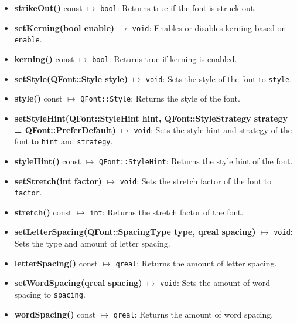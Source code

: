 \documentclass{report}
\begin{document}
\begin{itemize}
        \item \textbf{strikeOut()} const $\mapsto$ \texttt{bool}: Returns true if the font is struck out.
        \item \textbf{setKerning(bool enable)} $\mapsto$ \texttt{void}: Enables or disables kerning based on \texttt{enable}.
        \item \textbf{kerning()} const $\mapsto$ \texttt{bool}: Returns true if kerning is enabled.
        \item \textbf{setStyle(QFont::Style style)} $\mapsto$ \texttt{void}: Sets the style of the font to \texttt{style}.
        \item \textbf{style()} const $\mapsto$ \texttt{QFont::Style}: Returns the style of the font.
        \item \textbf{setStyleHint(QFont::StyleHint hint, QFont::StyleStrategy strategy = QFont::PreferDefault)} $\mapsto$ \texttt{void}: Sets the style hint and strategy of the font to \texttt{hint} and \texttt{strategy}.
        \item \textbf{styleHint()} const $\mapsto$ \texttt{QFont::StyleHint}: Returns the style hint of the font.
        \item \textbf{setStretch(int factor)} $\mapsto$ \texttt{void}: Sets the stretch factor of the font to \texttt{factor}.
        \item \textbf{stretch()} const $\mapsto$ \texttt{int}: Returns the stretch factor of the font.
        \item \textbf{setLetterSpacing(QFont::SpacingType type, qreal spacing)} $\mapsto$ \texttt{void}: Sets the type and amount of letter spacing.
        \item \textbf{letterSpacing()} const $\mapsto$ \texttt{qreal}: Returns the amount of letter spacing.
        \item \textbf{setWordSpacing(qreal spacing)} $\mapsto$ \texttt{void}: Sets the amount of word spacing to \texttt{spacing}.
        \item \textbf{wordSpacing()} const $\mapsto$ \texttt{qreal}: Returns the amount of word spacing.
    \end{itemize}
\end{document}
